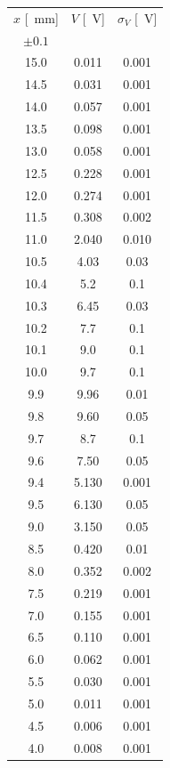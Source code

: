 \documentclass[10pt,oneside,a4paper]{article}
\begin{document}
\begin{minipage}[t]{0.33\linewidth}
\vspace{0cm}
\begin{center}
\label{tab:babinet}
\begin{tabular}{c|c|c}
$x$ [\SI{}{mm}] & $V$ [\SI{}{V}] & $\sigma_V$ [\SI{}{V}]\\
$\pm 0.1$ & & \\
\hline
 15.0 & 0.011 & 0.001 \\
 14.5 & 0.031 & 0.001 \\
 14.0 & 0.057 & 0.001 \\
 13.5 & 0.098 & 0.001 \\
 13.0 & 0.058 & 0.001 \\
 12.5 & 0.228 & 0.001 \\
 12.0 & 0.274 & 0.001 \\
 11.5 & 0.308 & 0.002 \\
 11.0 & 2.040 & 0.010 \\
 10.5 & 4.03 & 0.03 \\
  10.4 & 5.2 & 0.1 \\
 10.3 & 6.45 & 0.03 \\
 10.2 & 7.7 & 0.1 \\
  10.1 & 9.0 & 0.1 \\
 10.0 & 9.7 & 0.1 \\
   9.9 & 9.96 & 0.01 \\
  9.8 & 9.60 & 0.05 \\
  9.7 & 8.7 & 0.1 \\
  9.6 & 7.50 & 0.05 \\
  9.4 & 5.130 & 0.001 \\
  9.5 & 6.130& 0.05 \\
  9.0 & 3.150& 0.05 \\
  8.5 & 0.420& 0.01 \\
  8.0 & 0.352 & 0.002 \\
  7.5 & 0.219 & 0.001 \\
  7.0 & 0.155 & 0.001 \\
  6.5 & 0.110 & 0.001 \\
  6.0 & 0.062 & 0.001 \\
  5.5 & 0.030 & 0.001 \\
  5.0 & 0.011 & 0.001 \\
  4.5 & 0.006 & 0.001 \\
  4.0 & 0.008 & 0.001 \\
\hline
\end{tabular}
\end{center}
\end{minipage}
\end{document}
